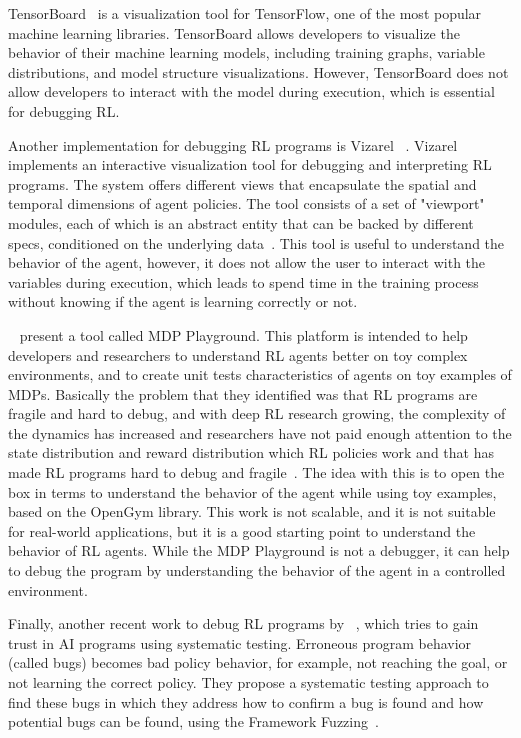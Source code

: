 TensorBoard~\cite{tensorboard} is a 
visualization tool for TensorFlow, one of the most popular machine learning libraries. 
TensorBoard allows developers to visualize the behavior of their machine learning models, 
including training graphs, variable distributions, and model structure visualizations. However, 
TensorBoard does not allow developers to interact with the model during execution, which is 
essential for debugging \ac{RL}.

Another implementation for debugging \ac{RL} programs is \ac{Vizarel} ~\cite{deshpande2020interactivevisualizationdebuggingrl}.
\ac{Vizarel} implements an interactive visualization tool for debugging and interpreting \ac{RL} 
programs. The system offers different views that encapsulate the spatial and temporal dimensions 
of agent policies. The tool consists of a set of "viewport" modules, each of which is an abstract 
entity that can be backed by different specs, conditioned on the underlying data~\cite{deshpande2020interactivevisualizationdebuggingrl}. This tool 
is useful to understand the behavior of the agent, however, it does not allow the user to interact with the 
variables during execution, which leads to spend time in the training process without knowing if
the agent is learning correctly or not.

~\citet{Rajan_2023} present a tool called \ac{MDP} Playground. This platform is intended to help developers and researchers to understand
\ac{RL} agents better on toy complex environments, and to create unit tests characteristics of agents 
on toy examples of \ac{MDP}s. Basically the problem that they identified was that \ac{RL} programs 
are fragile and hard to debug, and with deep \ac{RL} research growing, the complexity of the 
dynamics has increased and researchers have not paid enough attention to the state distribution and 
reward distribution which \ac{RL} policies work and that has made \ac{RL} programs hard to debug 
and fragile~\cite{Rajan_2023}. The idea with this is to open the box in terms to understand the behavior of the agent 
while using toy examples, based on the OpenGym library. This work is not scalable, and it is not 
suitable for real-world applications, but it is a good starting point to understand the behavior of 
\ac{RL} agents. While the \ac{MDP} Playground is not a debugger, it can help to debug the program by understanding the 
behavior of the agent in a controlled environment.

Finally, another recent work to debug \ac{RL} programs by ~\citet{Steinmetz2021DebuggingAP},
which tries to gain trust in \ac{AI} programs using systematic testing. Erroneous program behavior
(called bugs) becomes bad policy behavior, for example, not reaching the 
goal, or not learning the correct policy. They propose a systematic testing approach to find these 
bugs in which they address how to confirm a bug is found and how potential bugs can be found, 
using the Framework Fuzzing~\cite{Steinmetz2021DebuggingAP}.

